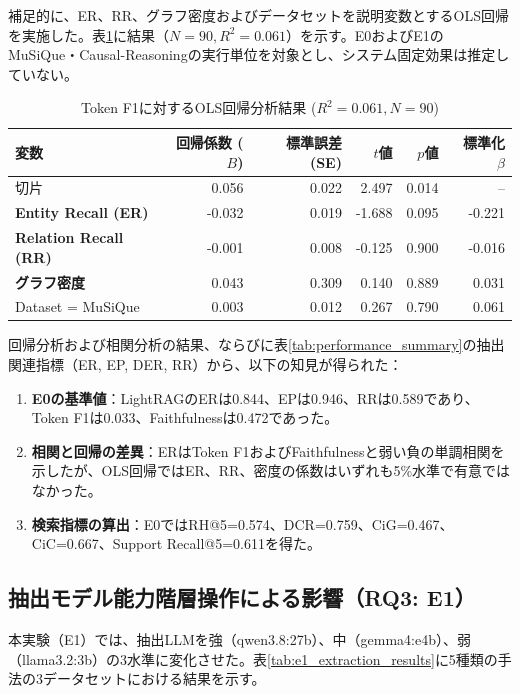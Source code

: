 \documentclass[a4j,dvipdfmx]{jsarticle}
\begin{document}
補足的に、ER、RR、グラフ密度およびデータセットを説明変数とするOLS回帰を実施した。表\ref{tab:regression_results}に結果（$N=90, R^2 = 0.061$）を示す。E0およびE1のMuSiQue・Causal-Reasoningの実行単位を対象とし、システム固定効果は推定していない。

\begin{table}[t]
\centering
\caption{Token F1に対するOLS回帰分析結果 ($R^2 = 0.061, N=90$)}
\label{tab:regression_results}
\small
\begin{tabular}{l|rrrrr}
\hline
\textbf{変数} & \textbf{回帰係数 ($B$)} & \textbf{標準誤差 (SE)} & \textbf{$t$値} & \textbf{$p$値} & \textbf{標準化 $\beta$} \\
\hline
切片 & 0.056 & 0.022 & 2.497 & 0.014 & -- \\
\textbf{Entity Recall (ER)} & -0.032 & 0.019 & -1.688 & 0.095 & -0.221 \\
\textbf{Relation Recall (RR)} & -0.001 & 0.008 & -0.125 & 0.900 & -0.016 \\
\textbf{グラフ密度} & 0.043 & 0.309 & 0.140 & 0.889 & 0.031 \\
Dataset = MuSiQue & 0.003 & 0.012 & 0.267 & 0.790 & 0.061 \\
\hline
\end{tabular}
\end{table}

回帰分析および相関分析の結果、ならびに表\ref{tab:performance_summary}の抽出関連指標（ER, EP, DER, RR）から、以下の知見が得られた：
\begin{enumerate}
    \item \textbf{E0の基準値}：LightRAGのERは0.844、EPは0.946、RRは0.589であり、Token F1は0.033、Faithfulnessは0.472であった。
    \item \textbf{相関と回帰の差異}：ERはToken F1およびFaithfulnessと弱い負の単調相関を示したが、OLS回帰ではER、RR、密度の係数はいずれも5\%水準で有意ではなかった。
    \item \textbf{検索指標の算出}：E0ではRH@5=0.574、DCR=0.759、CiG=0.467、CiC=0.667、Support Recall@5=0.611を得た。
\end{enumerate}

\subsection{抽出モデル能力階層操作による影響（RQ3: E1）}
本実験（E1）では、抽出LLMを強（qwen3.8:27b）、中（gemma4:e4b）、弱（llama3.2:3b）の3水準に変化させた。表\ref{tab:e1_extraction_results}に5種類の手法の3データセットにおける結果を示す。
\end{document}
